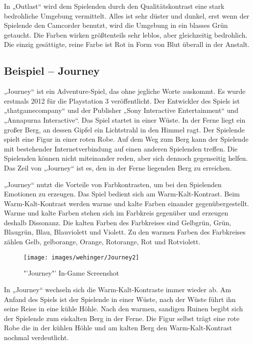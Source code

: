 In „Outlast“ wird dem Spielenden durch den Qualitätskontrast eine stark bedrohliche Umgebung vermittelt. Alles ist sehr düster und dunkel, erst wenn der Spielende den Camcorder benutzt, wird die Umgebung in ein blasses Grün getaucht. Die Farben wirken größtenteils sehr leblos, aber gleichzeitig bedrohlich. Die einzig gesättigte, reine Farbe ist Rot in Form von Blut überall in der Anstalt. 
\cite{_outlast}
\cite{_farbkontraste}
\cite{_farbkontraste_im_gaming}

\subsection{Beispiel – Journey}
„Journey“ ist ein Adventure-Spiel, das ohne jegliche Worte auskommt. Es wurde erstmals 2012 für die Playstation 3 veröffentlicht. Der Entwickler des Spiels ist „thatgamecompany“ und der Publisher „Sony Interactive Entertainment“ und „Annapurna Interactive“. Das Spiel startet in einer Wüste. In der Ferne liegt ein großer Berg, an dessen Gipfel ein Lichtstrahl in den Himmel ragt. Der Spielende spielt eine Figur in einer roten Robe. Auf dem Weg zum Berg kann der Spielende mit bestehender Internetverbindung auf einen anderen Spielenden treffen. Die Spielenden können nicht miteinander reden, aber sich dennoch gegenseitig helfen. Das Zeil von „Journey“ ist es, den in der Ferne liegenden Berg zu erreichen.
\cite{_drawing_basics_and_video_game_art}
\cite{_farbkontraste_im_gaming}

„Journey“ nutzt die Vorteile von Farbkontrasten, um bei den Spielenden Emotionen zu erzeugen. Das Spiel bedient sich am Warm-Kalt-Kontrast. Beim Warm-Kalt-Kontrast werden warme und kalte Farben einander gegenübergestellt. Warme und kalte Farben stehen sich im Farbkreis gegenüber und erzeugen deshalb Dissonanz. Die kalten Farben des Farbkreises sind Gelbgrün, Grün, Blaugrün, Blau, Blauviolett und Violett. Zu den warmen Farben des Farbkreises zählen Gelb, gelborange, Orange, Rotorange, Rot und Rotviolett.
\cite{_farbkontraste_im_gaming}
\cite{_drawing_basics_and_video_game_art}
\cite{_farbkontraste}

\begin{figure}[H]
	\centering
	\texttt{[image: images/wehinger/Journey2]}
	\caption{"'Journey"' In-Game Screenshot\cite{_drawing_basics_and_video_game_art}}
\end{figure}

In „Journey“ wechseln sich die Warm-Kalt-Kontraste immer wieder ab. Am Anfand des Spiels ist der Spielende in einer Wüste, nach der Wüste führt ihn seine Reise in eine kühle Höhle. Nach den warmen, sandigen Ruinen begibt sich der Spielende zum eiskalten Berg in der Ferne. Die Figur selbst trägt eine rote Robe die in der kühlen Höhle und am kalten Berg den Warm-Kalt-Kontrast nochmal verdeutlicht. 
\cite{_drawing_basics_and_video_game_art}
\cite{_farbkontraste_im_gaming}
\cite{_farbkontraste}

